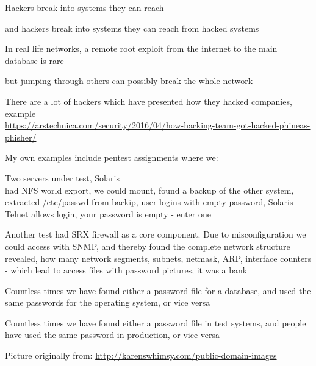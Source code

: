 \documentclass[Screen16to9,17pt]{foils}
\begin{document}

\begin{list1}
\item Hackers break into systems they can reach
\item and hackers break into systems they can reach from hacked systems \smiley
\item In real life networks, a remote root exploit from the internet to the main database is rare
\item but jumping through others can possibly break the whole network
\item There are a lot of hackers which have presented how they hacked companies, example\\
{\tiny\url{https://arstechnica.com/security/2016/04/how-hacking-team-got-hacked-phineas-phisher/}}
\end{list1}


\begin{list1}
\item My own examples include pentest assignments where we:
\begin{list2}
\item Two servers under test, Solaris\\
had NFS world export, we could mount, found a backup of the other system, extracted /etc/passwd from backip, user logins with empty password, Solaris Telnet allows login, your password is empty - enter one
\item Another test had SRX firewall as a core component. Due to misconfiguration we could access with SNMP, and thereby found the complete network structure revealed, how many network segments, subnets, netmask, ARP, interface counters - which lead to access files with password pictures, it was a bank
\item Countless times we have found either a password file for a database, and used the same passwords for the operating system, or vice versa
\item Countless times we have found either a password file in test systems, and people have used the same password in production, or vice versa
\end{list2}
\end{list1}



\centerline{Picture originally from: \url{http://karenswhimsy.com/public-domain-images}}
\end{document}
